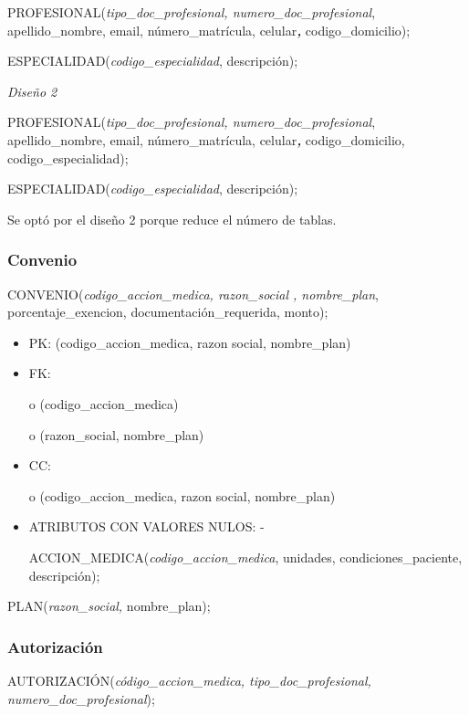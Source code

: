 \documentclass[a4paper,11pt]{article}
\begin{document}
PROFESIONAL(\emph{tipo\_doc\_profesional, numero\_doc\_profesional}, apellido\_nombre, 
email, número\_matrícula, celular\textit{\textbf{, }}codigo\_domicilio);

ESPECIALIDAD(\emph{codigo\_especialidad}, descripción);

\textit{Diseño 2}

PROFESIONAL(\emph{tipo\_doc\_profesional, numero\_doc\_profesional}, apellido\_nombre, 
email, número\_matrícula, celular\textit{\textbf{, }}codigo\_domicilio,\textit{\textbf{ 
}}codigo\_especialidad);

ESPECIALIDAD(\emph{codigo\_especialidad}, descripción);

Se optó por el diseño 2 porque reduce el número de tablas.\label{HToc293405846}

\subsubsection{\textbf{Convenio}}

CONVENIO(\emph{codigo\_accion\_medica, razon\_social , nombre\_plan}, porcentaje\_exencion, 
documentación\_requerida, monto);

\begin{itemize}
\item PK: (codigo\_accion\_medica, razon social, nombre\_plan)

\item FK: 

o (codigo\_accion\_medica)

o (razon\_social,  nombre\_plan)

\item CC:

o (codigo\_accion\_medica, razon social, nombre\_plan)

\item ATRIBUTOS CON VALORES NULOS:  -

ACCION\_MEDICA(\emph{codigo\_accion\_medica}, unidades, condiciones\_paciente, 
descripción);
\end{itemize}

PLAN(\emph{razon\_social, }nombre\_plan);\label{HToc293405847}

\subsubsection{\textbf{Autorización}}

AUTORIZACIÓN(\emph{código\_accion\_medica, tipo\_doc\_profesional, numero\_doc\_profesional});
\end{document}
